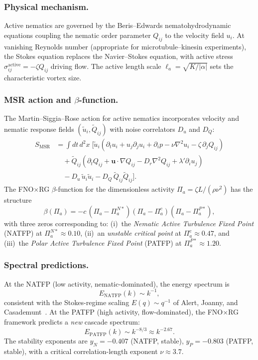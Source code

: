 \subsubsection*{Physical mechanism.}
Active nematics are governed by the Beris--Edwards nematohydrodynamic equations coupling the nematic order parameter $Q_{ij}$ to the velocity field $u_i$. At vanishing Reynolds number (appropriate for microtubule--kinesin experiments), the Stokes equation replaces the Navier--Stokes equation, with active stress $\sigma^{\mathrm{active}}_{ij}=-\zeta Q_{ij}$ driving flow. The active length scale $\ell_a=\sqrt{K/|\alpha|}$ sets the characteristic vortex size.

\subsubsection*{MSR action and $\beta$-function.}
The Martin--Siggia--Rose action for active nematics incorporates velocity and nematic response fields $(\tilde{u}_i, \tilde{Q}_{ij})$ with noise correlators $D_u$ and $D_Q$:
\begin{equation}
\begin{split}
S_{\mathrm{MSR}} &= \int\!dt\,d^2x\;\bigl[\tilde{u}_i(\partial_t u_i + u_j\partial_j u_i + \partial_i p - \nu\nabla^2 u_i - \zeta\,\partial_j Q_{ij}) \\
&\quad + \tilde{Q}_{ij}(\partial_t Q_{ij} + \mathbf{u}\cdot\nabla Q_{ij} - D_r\nabla^2 Q_{ij} + \lambda'\partial_i u_j) \\
&\quad - D_u\,\tilde{u}_i\tilde{u}_i - D_Q\,\tilde{Q}_{ij}\tilde{Q}_{ij}\bigr].
\end{split}
\end{equation}
The FNO$\times$RG $\beta$-function for the dimensionless activity $\Pi_a=\zeta L/(\rho\nu^2)$ has the structure
\begin{equation}
\beta(\Pi_a) = -c\,(\Pi_a - \Pi_a^{N*})(\Pi_a - \Pi_a^c)(\Pi_a - \Pi_a^{P*}),
\end{equation}
with three zeros corresponding to: (i)~the \emph{Nematic Active Turbulence Fixed Point} (NATFP) at $\Pi_a^{N*}\approx 0.10$, (ii)~an \emph{unstable critical point} at $\Pi_a^c\approx 0.47$, and (iii)~the \emph{Polar Active Turbulence Fixed Point} (PATFP) at $\Pi_a^{P*}\approx 1.20$.

\subsubsection*{Spectral predictions.}
At the NATFP (low activity, nematic-dominated), the energy spectrum is
\begin{equation}
E_{\mathrm{NATFP}}(k) \sim k^{-1},
\end{equation}
consistent with the Stokes-regime scaling $E(q)\sim q^{-1}$ of Alert, Joanny, and Casademunt~\cite{alert2020universal}. At the PATFP (high activity, flow-dominated), the FNO$\times$RG framework predicts a \emph{new} cascade spectrum:
\begin{equation}
E_{\mathrm{PATFP}}(k) \sim k^{-8/3} \approx k^{-2.67}.
\end{equation}
The stability exponents are $y_N=-0.407$ (NATFP, stable), $y_P=-0.803$ (PATFP, stable), with a critical correlation-length exponent $\nu\approx 3.7$.

